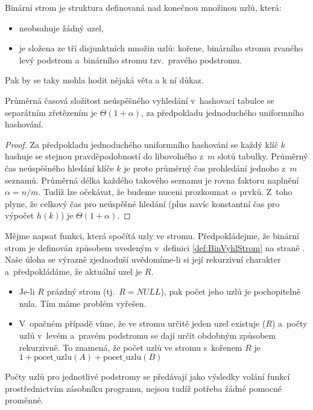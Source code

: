 \documentclass[bc,male,java,dept460]{diploma}		%
\begin{document}
\begin{definition}
\label{def:BinVyhlStrom}
Binární strom je struktura definovaná nad konečnou množinou uzlů, která:
\begin{itemize}
\item neobsahuje žádný uzel,
\item je složena ze tří disjunktních množin uzlů:
      kořene, binárního stromu zvaného levý podstrom a~binárního stromu tzv.\ pravého podstromu.
\end{itemize}
\end{definition}

Pak by se taky mohla hodit nějaká věta a k ní důkaz.

\begin{theorem}
\label{VetaNeuspechSepar}
Průměrná časová složitost neúspěšného vyhledání  v~hashovací tabulce se  separátním zřetězením je $\Theta(1+\alpha)$, za předpokladu jednoduchého uniformního hashování.
\end{theorem}
\begin{proof}
Za předpokladu jednoduchého uniformního hashování se každý  klíč
$k$ hashuje se stejnou pravděpodobností do libovolného z~$m$ slotů
tabulky. Průměrný čas neúspěšného hledání klíče $k$ je proto
průměrný čas prohledání jednoho z~$m$ seznamů. Průměrná délka
každého takového seznamu je rovna faktoru naplnění $\alpha=n/m$.
Tudíž lze očekávat, že budeme nuceni prozkoumat $\alpha$ prvků.
Z~toho plyne, že celkový čas pro neúspěšné hledání (plus navíc
konstantní čas pro výpočet $h(k)$) je $\Theta(1+\alpha)$.
\end{proof}

\begin{example}
\label{priklad}
Mějme napsat funkci, která spočítá uzly ve stromu. Předpokládejme,
že binární strom je definován způsobem uvedeným v~definici
\ref{def:BinVyhlStrom} na straně \pageref{def:BinVyhlStrom}. Naše úloha se výrazně zjednoduší
uvědomíme-li si její rekurzivní charakter a~předpokládáme, že aktuální uzel je $R$.
\begin{itemize}
\item Je-li $R$ prázdný strom (tj.\ $R=NULL$), pak počet jeho uzlů je pochopitelně nula. Tím máme problém vyřešen.

\item V~opačném případě víme, že ve stromu  určitě jeden uzel existuje ($R$) a~počty uzlů
v~levém a~pravém podstromu se dají určit obdobným způsobem
rekurzivně. To znamená, že počet uzlů ve stromu s~kořenem $R$ je
$1 + \mathrm{pocet\_uzlu}(A) + \mathrm{pocet\_uzlu}(B)$
\end{itemize}

Počty uzlů pro jednotlivé podstromy se předávají jako výsledky
volání funkcí prostřednictvím zásobníku programu, nejsou tudíž
potřeba žádné pomocné proměnné.
\end{example}
\end{document}
